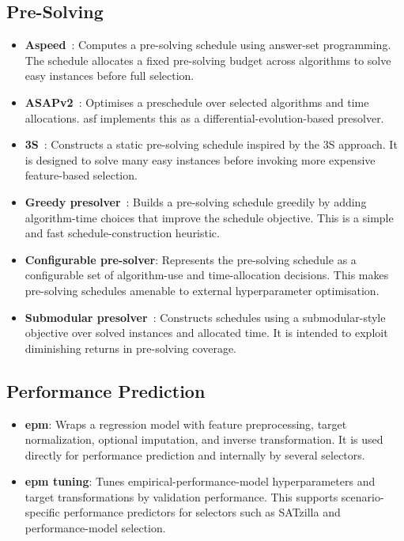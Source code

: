 \subsection{Pre-Solving}
\begin{itemize}
    \item \textbf{Aspeed}~\citep{HooEtAl12}: Computes a pre-solving schedule using answer-set programming. The schedule allocates a fixed pre-solving budget across algorithms to solve easy instances before full selection.
    \item \textbf{ASAPv2}~\citep{GonEtAl17}: Optimises a preschedule over selected algorithms and time allocations. \gls{asf} implements this as a differential-evolution-based presolver.
    \item \textbf{3S}~\citep{KadEtAl11}: Constructs a static pre-solving schedule inspired by the 3S approach. It is designed to solve many easy instances before invoking more expensive feature-based selection.
    \item \textbf{Greedy presolver}~\citep{XuEtAl08}: Builds a pre-solving schedule greedily by adding algorithm-time choices that improve the schedule objective. This is a simple and fast schedule-construction heuristic.
    \item \textbf{Configurable pre-solver}: Represents the pre-solving schedule as a configurable set of algorithm-use and time-allocation decisions. This makes pre-solving schedules amenable to external hyperparameter optimisation.
    \item \textbf{Submodular presolver}~\citep{StrGol08}: Constructs schedules using a submodular-style objective over solved instances and allocated time. It is intended to exploit diminishing returns in pre-solving coverage.
\end{itemize}

\subsection{Performance Prediction}
\begin{itemize}
    \item \textbf{\Gls{epm}}: Wraps a regression model with feature preprocessing, target normalization, optional imputation, and inverse transformation. It is used directly for performance prediction and internally by several selectors.
    \item \textbf{\gls{epm} tuning}: Tunes empirical-performance-model hyperparameters and target transformations by validation performance. This supports scenario-specific performance predictors for selectors such as SATzilla and performance-model selection.
\end{itemize}

